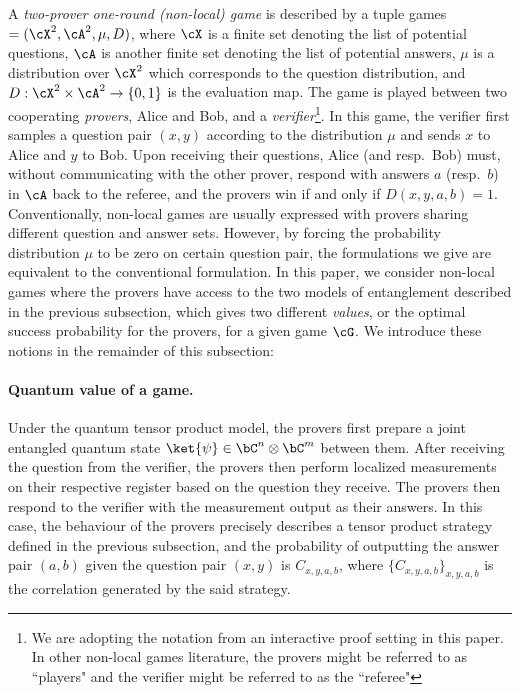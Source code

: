 A \textit{two-prover one-round (non-local) game} is described by a tuple \gls{games}$= (\cX^2, \cA^2, \mu, D)$, where $\cX$ is a finite set denoting the list of potential questions, $\cA$ is another finite set denoting the list of potential answers, $\mu$ is a distribution over $\cX^2$ which corresponds to the question distribution, and $D: \cX^2 \times \cA^2 \rightarrow \{0,1\}$ is the evaluation map. The game is played between two cooperating \textit{provers}, Alice and Bob, and a \textit{verifier}\footnote{We are adopting the notation from an interactive proof setting in this paper. In other non-local games literature, the provers might be referred to as ``players" and the verifier might be referred to as the ``referee" }. In this game, the verifier first samples a question pair $(x,y)$ according to the distribution $\mu$ and sends $x$ to Alice and $y$ to Bob. Upon receiving their questions, Alice (and resp.~Bob) must, without communicating with the other prover, respond with answers $a$ (resp.~$b$) in $\cA$ back to the referee, and the provers win if and only if $D(x,y,a,b) = 1$. Conventionally, non-local games are usually expressed with provers sharing different question and answer sets. However, by forcing the probability distribution $\mu$ to be zero on certain question pair, the formulations we give are equivalent to the conventional formulation. In this paper, we consider non-local games where the provers have access to the two models of entanglement described in the previous subsection, which gives two different \textit{values}, or the optimal success probability for the provers, for a given game $\cG$. We introduce these notions in the remainder of this subsection: 

\paragraph{Quantum value of a game. }  Under the quantum tensor product model, the provers first prepare a joint entangled quantum state $\ket{\psi} \in \bC^n \otimes \bC^m$ between them. After receiving the question from the verifier, the provers then perform localized measurements on their respective register based on the question they receive. The provers then respond to the verifier with the measurement output as their answers. In this case, the behaviour of the provers precisely describes a tensor product strategy defined in the previous subsection, and the probability of outputting the answer pair $(a,b)$ given the question pair $(x,y)$ is $C_{x,y,a,b}$, where $\{C_{x,y,a,b}\}_{x,y,a,b}$ is the correlation generated by the said strategy. 

